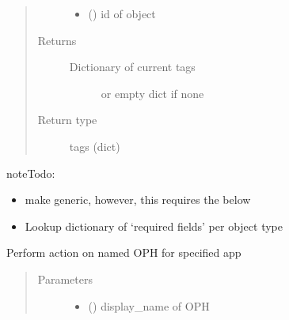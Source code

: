 \documentclass[letterpaper,10pt,english]{sphinxmanual}
\begin{document}
\begin{fulllineitems}
\begin{fulllineitems}
\begin{quote}
\begin{description}
\begin{itemize}
\item {} 
\sphinxAtStartPar
{} () \textendash{} id of object

\end{itemize}

\item[{Returns}] \leavevmode
\sphinxAtStartPar
\begin{description}
\item[{Dictionary of current tags}] \leavevmode
\sphinxAtStartPar
or empty dict if none

\end{description}


\item[{Return type}] \leavevmode
\sphinxAtStartPar
tags (dict)

\end{description}\end{quote}

\begin{sphinxadmonition}{note}{\label{\detokenize{b1oph-class:id1}}Todo:}\begin{itemize}
\item {} 
\sphinxAtStartPar
make generic, however, this requires the below

\item {} 
\sphinxAtStartPar
Lookup dictionary of ‘required fields’ per object type

\end{itemize}
\end{sphinxadmonition}

\end{fulllineitems}


\begin{fulllineitems}
\label{\detokenize{b1oph-class:bloxone.b1oph.manage_app}}
\sphinxAtStartPar
Perform action on named OPH for specified app
\begin{quote}\begin{description}
\item[{Parameters}] \leavevmode\begin{itemize}
\item {} 
\sphinxAtStartPar
{} () \textendash{} display\_name of OPH


\end{itemize}
\end{description}
\end{quote}
\end{fulllineitems}
\end{fulllineitems}
\end{document}
